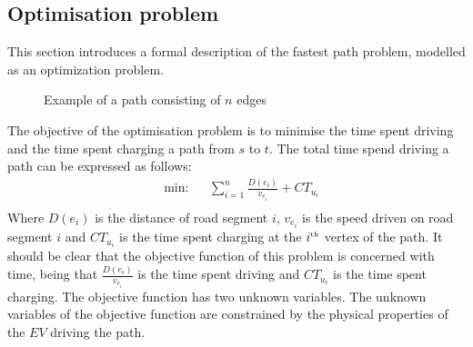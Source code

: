 \subsection{Optimisation problem}\label{sec:optiprob}
This section introduces a formal description of the fastest path problem, modelled as an optimization problem.

\begin{figure}[h!]
\centering
    \caption{Example of a path consisting of $n$ edges} \label{fig:pathexample}
\end{figure}

The objective of the optimisation problem is to minimise the time spent driving
and the time spent charging a path from $s$ to $t$. The total time spend driving a path can be expressed as follows:
\begin{equation*}
\begin{aligned} &
{\text{min:}}
& & \sum_{i=1}^{n} \frac{D(e_i)}{v_{e_i}} + CT_{u_i} \\
\end{aligned}
\end{equation*}\label{eq:objfunction}
Where $D(e_i)$ is the distance of road segment $i$, $v_{e_i}$ is the speed driven on road segment $i$ and $CT_{u_i}$ is the time spent charging at the $i^{\text{\tiny th}}$ vertex of the path. It should be clear that the objective function of this problem is concerned with time, being that $\frac{D(e_i)}{v_{e_i}}$ is the time spent driving and $CT_{u_i}$ is the time spent charging. The objective function has two unknown variables. The unknown variables of the objective function are constrained by the physical properties of the $EV$ driving the path.


